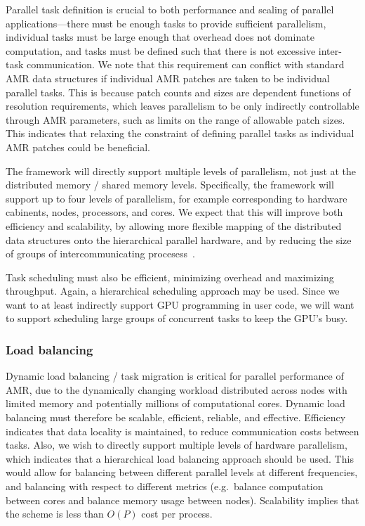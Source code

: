 \documentclass[10pt,twocolumn]{article}
\begin{document}
Parallel task definition is crucial to both performance and scaling of
parallel applications---there must be enough tasks to provide
sufficient parallelism, individual tasks must be large enough that
overhead does not dominate computation, and tasks must be defined such
that there is not excessive inter-task communication.  We note that
this requirement can conflict with standard AMR data structures if
individual AMR patches are taken to be individual parallel tasks.
This is because patch counts and sizes are dependent functions of
resolution requirements, which leaves parallelism to be only
indirectly controllable through AMR parameters, such as limits on the
range of allowable patch sizes.  This indicates that relaxing the
constraint of defining parallel tasks as individual AMR patches could
be beneficial.

The framework will directly support multiple levels of parallelism,
not just at the distributed memory / shared memory levels.
Specifically, the framework will support up to four levels of
parallelism, for example corresponding to hardware cabinents, nodes,
processors, and cores.  We expect that this will improve both
efficiency and scalability, by allowing more flexible mapping of the
distributed data structures onto the hierarchical parallel hardware,
and by reducing the size of groups of intercommunicating
procesess~\cite{BaBu09}.

Task scheduling must also be efficient, minimizing overhead and
maximizing throughput.  Again, a hierarchical scheduling approach may
be used.  Since we want to at least indirectly support GPU programming
in user code, we will want to support scheduling large groups of
concurrent tasks to keep the GPU's busy.

\subsubsection{Load balancing} \label{ss:require-balance}

Dynamic load balancing / task migration is critical for parallel
performance of AMR, due to the dynamically changing workload
distributed across nodes with limited memory and potentially millions
of computational cores.  Dynamic load balancing must therefore be
scalable, efficient, reliable, and effective.  Efficiency indicates
that data locality is maintained, to reduce communication costs
between tasks.  Also, we wish to directly support multiple levels of
hardware parallelism, which indicates that a hierarchical load
balancing approach should be used.  This would allow for balancing
between different parallel levels at different frequencies, and
balancing with respect to different metrics (e.g.~balance computation
between cores and balance memory usage between nodes).  Scalability
implies that the scheme is less than $O(P)$ cost per process.
\end{document}
